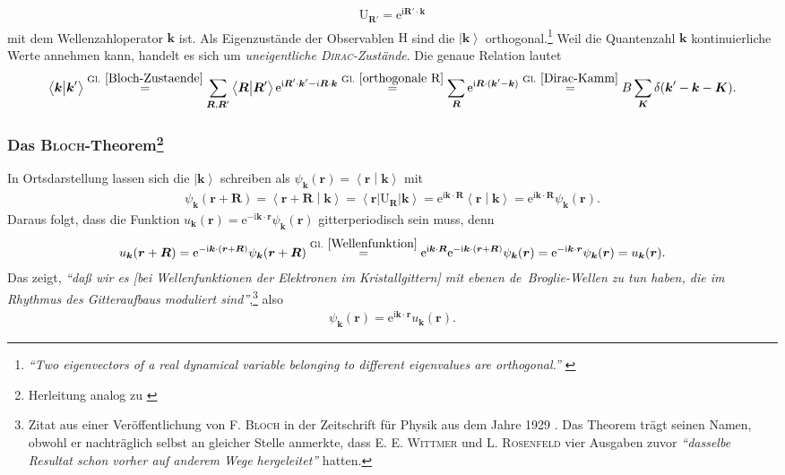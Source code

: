 \documentclass[a4paper, 10pt, twoside, openany]{book} %
\newcommand \bra[1]{\left \langle #1 \right |}
\newcommand \ket[1]{\left | #1 \right \rangle}
\newcommand \bracket[2]{\left \langle #1 \middle | #2 \right \rangle}
\def \I {\mathrm i}
\def \E {\mathrm e}
\def \vec {\boldsymbol}
\newcommand \op[1]{\mathrm{#1}}
\begin{document}
	\begin{align*}
		\op U_{\vec R'} = \E^{\I \vec R' \cdot \mathbf k}
	\end{align*}
	mit dem Wellenzahloperator $\mathbf k$ ist. Als Eigenzustände der Observablen $\op H$ sind die $\ket{\vec k}$ orthogonal.\footnote{\emph{"`Two eigenvectors of a real dynamical variable belonging to different eigenvalues are orthogonal."'} \cite[S.~32]{Dirac}} Weil die Quantenzahl $\vec k$ kontinuierliche Werte annehmen kann, handelt es sich um \emph{uneigentliche \textsc{Dirac}-Zustände}. Die genaue Relation lautet
	\begin{align}
		\bracket{\vec k}{\vec k'} \overset{\rm Gl.~\ref{Bloch-Zustaende}} = \sum_{\vec R, \vec R'} \bracket{\vec R}{\vec R'} \E^{\I \vec R' \cdot \vec k' - i \vec R \cdot \vec k} \overset{\rm Gl.~\ref{orthogonale R}} = \sum_{\vec R} \E^{\I \vec R \cdot (\vec k' - \vec k)} \overset{\rm Gl.~\ref{Dirac-Kamm}} = B \sum_{\vec K} \delta(\vec k' - \vec k - \vec K).
		\label{orthogonale k}
	\end{align}
	
	\subsubsection*{Das \textsc{Bloch}-Theorem\footnote{Herleitung analog zu \cite[S.~97]{Czycholl}}}
	
	In Ortsdarstellung lassen sich die $\ket{\vec k}$ schreiben als $\psi_{\vec k}(\vec r) = \bracket{\vec r}{\vec k}$ mit
	\begin{align}
		 \psi_{\vec k}(\vec r + \vec R) = \bracket{\vec r + \vec R}{\vec k} = \bra{\vec r} \op U_{\vec R} \ket{\vec k} = \E^{\I \vec k \cdot \vec R} \bracket{\vec r}{\vec k} = \E^{\I \vec k \cdot \vec R} \psi_{\vec k}(\vec r).
		 \label{Wellenfunktion}
	\end{align}
	Daraus folgt, dass die Funktion $u_{\vec k}(\vec r) = \E^{-\I \vec k \cdot \vec r} \psi_{\vec k}(\vec r)$ gitterperiodisch sein muss, denn
	\begin{align*}
		u_{\vec k}(\vec r + \vec R) = \E^{-\I \vec k \cdot (\vec r + \vec R)} \psi_{\vec k}(\vec r + \vec R) \overset{\rm Gl.~\ref{Wellenfunktion}} = \E^{\I \vec k \cdot \vec R} \E^{-\I \vec k \cdot (\vec r + \vec R)} \psi_{\vec k}(\vec r) = \E^{-\I \vec k \cdot \vec r} \psi_{\vec k}(\vec r) = u_{\vec k}(\vec r).
	\end{align*}
	Das zeigt, \emph{"`daß wir es \textnormal{[bei Wellenfunktionen der Elektronen im Kristallgittern]} mit ebenen de~Broglie-Wellen zu tun haben, die im Rhythmus des Gitteraufbaus moduliert sind"'},\footnote{Zitat aus einer Veröffentlichung von \textsc{F. Bloch} in der Zeitschrift für Physik aus dem Jahre 1929 \cite[S.~559]{Bloch}. Das Theorem trägt seinen Namen, obwohl er nachträglich selbst an gleicher Stelle anmerkte, dass \textsc{E. E. Wittmer} und \textsc{L. Rosenfeld} vier Ausgaben zuvor \emph{"`dasselbe Resultat schon vorher auf anderem Wege hergeleitet"'} hatten.} also
	\begin{align*}
		\psi_{\vec k}(\vec r) = \E^{\I \vec k \cdot \vec r} u_{\vec k}(\vec r).
	\end{align*}
	
\end{document}
